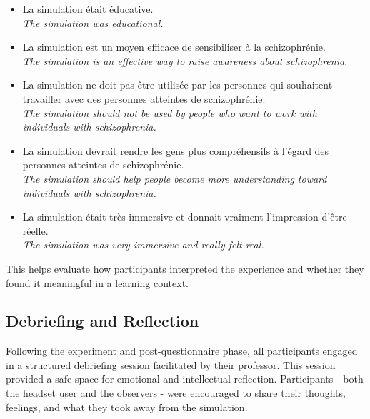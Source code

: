 \begin{itemize}
    \item La simulation était éducative. \\
    \textit{The simulation was educational.}

    \item La simulation est un moyen efficace de sensibiliser à la schizophrénie. \\
    \textit{The simulation is an effective way to raise awareness about schizophrenia.}

    \item La simulation ne doit pas être utilisée par les personnes qui souhaitent travailler avec des personnes atteintes de schizophrénie. \\
    \textit{The simulation should not be used by people who want to work with individuals with schizophrenia.}

    \item La simulation devrait rendre les gens plus compréhensifs à l’égard des personnes atteintes de schizophrénie. \\
    \textit{The simulation should help people become more understanding toward individuals with schizophrenia.}

    \item La simulation était très immersive et donnait vraiment l’impression d’être réelle. \\
    \textit{The simulation was very immersive and really felt real.}
\end{itemize}

This helps evaluate how participants interpreted the experience and whether they found it meaningful in a learning context.

\subsection{Debriefing and Reflection}

Following the experiment and post-questionnaire phase, all participants engaged in a structured debriefing session facilitated by their professor. This session provided a safe space for emotional and intellectual reflection. Participants - both the headset user and the observers - were encouraged to share their thoughts, feelings, and what they took away from the simulation.

